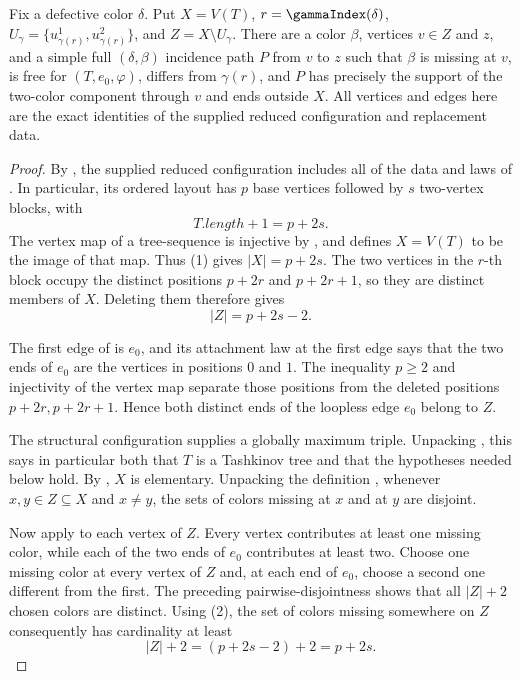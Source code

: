 \begin{helper}
Fix a defective color $\delta$.  Put
$X=V(T)$, $r=\gammaIndex(\delta)$,
$U_\gamma=\{u^1_{\gamma(r)},u^2_{\gamma(r)}\}$, and
$Z=X\setminus U_\gamma$.  There are a color $\beta$, vertices
$v\in Z$ and $z$, and a simple full $(\delta,\beta)$ incidence path
$P$ from $v$ to $z$ such that $\beta$ is missing at $v$, is free for
$(T,e_0,\varphi)$, differs from $\gamma(r)$, and $P$ has precisely the
support of the two-color component through $v$ and ends outside $X$.
All vertices and edges here are the exact identities of the supplied
reduced configuration and replacement data.
\end{helper}
\begin{proof}
By , the supplied reduced
configuration includes all of the data and laws of
.  In particular, its ordered
layout has $p$ base vertices followed by $s$ two-vertex blocks, with
\[
             T.length+1=p+2s.                                      \tag{1}
\]
The vertex map of a tree-sequence is injective by
, and  defines
$X=V(T)$ to be the image of that map.  Thus (1) gives $|X|=p+2s$.
The two vertices in the $r$-th block occupy the distinct positions
$p+2r$ and $p+2r+1$, so they are distinct members of $X$.  Deleting
them therefore gives
\[
                     |Z|=p+2s-2.                                  \tag{2}
\]

The first edge of  is $e_0$, and its attachment
law at the first edge says that the two ends of $e_0$ are the vertices
in positions $0$ and $1$.  The inequality $p\ge2$ and injectivity of
the vertex map separate those positions from the deleted positions
$p+2r,p+2r+1$.  Hence both distinct ends of the loopless edge $e_0$
belong to $Z$.

The structural configuration supplies a globally maximum triple.
Unpacking , this says in particular both
that $T$ is a Tashkinov tree and that the hypotheses needed below hold.
By , $X$ is elementary.  Unpacking
the definition , whenever
$x,y\in Z\subseteq X$ and $x\ne y$, the sets of colors missing at $x$
and at $y$ are disjoint.

Now apply  to each vertex of
$Z$.  Every vertex contributes at least one missing color, while each of
the two ends of $e_0$ contributes at least two.  Choose one missing
color at every vertex of $Z$ and, at each end of $e_0$, choose a second
one different from the first.  The preceding pairwise-disjointness
shows that all $|Z|+2$ chosen colors are distinct.  Using (2), the set
of colors missing somewhere on $Z$ consequently has cardinality at
least
\[
                  |Z|+2=(p+2s-2)+2=p+2s.                           \tag{3}
\]


\end{proof}
